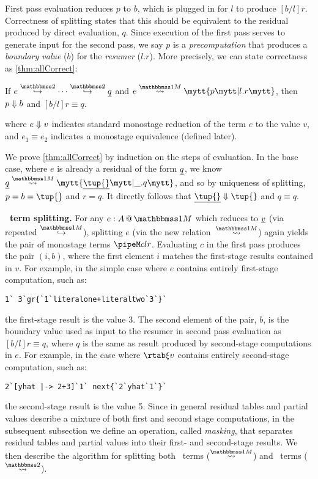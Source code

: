 \begin{abstrsyn}
First pass evaluation reduces $p$ to $b$,
which is plugged in for $l$ to produce $[b/l]r$.
Correctness of splitting states that this should be equivalent 
to the residual produced by direct evaluation, $q$.
Since execution of the first pass serves to generate input for
the second pass, we say $p$ is a {\em precomputation} that produces a
{\em boundary value} ($b$) for the {\em resumer} ($l.r$).
More precisely, we can state correctness as \ref{thm:allCorrect}:
\begin{theorem}
\label{thm:allCorrect}
If $e \stepsym \bbtwo \cdots \stepsym \bbtwo \exv q$ and $\splitone e A p {l.r}$,
then ${p} \Downarrow {b}$ and $[b/l]r \equiv q$.
\end{theorem}
where ${e} \Downarrow {v}$ indicates standard monostage reduction of the term $e$ to the value $v$,
and $e_1 \equiv e_2$ indicates a monostage equivalence (defined later).

We prove \ref{thm:allCorrect} by induction on the steps of evaluation.  
In the base case, where $e$ is already a residual of the form $\underline{q}$, we know
$\splitone {\exv q} A {\exv{\tup{}}} {\_.q}$, and so by uniqueness of splitting, 
$p = b = \tup{}$ and $r = q$.
It directly follows that $\reduce {\exv {\tup {}}} {\tup {}}$ and $q \equiv q$.


\textbf{\bbonem\ term splitting.}  For any $\colmix e A$ which reduces
to $\underline{v}$ (via repeated $\stepsym \bbonem$), 
splitting $e$ (via the new relation~$\splitonesym$) again 
yields the pair of monostage terms $\pipeM c l r$. 
Evaluating $c$ in the first pass produces the pair
$(i,b)$, where the first element $i$ matches the first-stage results
contained in $v$.  For example, in the simple case where $e$
contains entirely first-stage computation, such as:
\begin{lstlisting}
1` 3`gr{`1`literalone+literaltwo`3`}`
\end{lstlisting}
the first-stage result is the value 3.  The second element of the pair, $b$,
is the boundary value used as input to the resumer in second pass
evaluation as $[b/l]r \equiv q$, where $q$ is the same as
result produced by second-stage computations in $e$.  For example, in
the case where $\rtab \xi v$ contains entirely second-stage
computation, such as:
\begin{lstlisting}
2`[yhat |-> 2+3]`1` next{`2`yhat`1`}`
\end{lstlisting}
the second-stage result is the value 5. Since in general residual
tables and partial values describe a mixture of both first and second
stage computations, in the subsequent subsection we define an
operation, called {\em masking}, that separates residual tables and
partial values into their first- and second-stage results. We then
describe the algorithm for splitting both \bbonem\ terms
($\splitonesym$) and \bbtwo\ terms ($\splittwosym$).



\end{abstrsyn}
